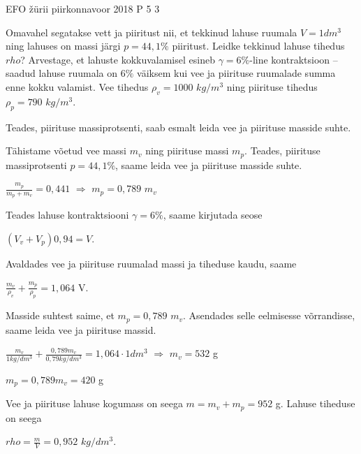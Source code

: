 {EFO žürii} %
{piirkonnavoor} %
{2018} %
{P 5} %
{3} %
{

\ifStatement
Omavahel segatakse vett ja piiritust nii, et tekkinud lahuse ruumala $V = 1 dm^3$ ning lahuses on massi järgi $p = 44,1\%$ piiritust. Leidke tekkinud lahuse tihedus $rho$? Arvestage, et lahuste kokkuvalamisel esineb $\gamma = 6 \%$-line kontraktsioon – saadud lahuse ruumala on $6 \%$ väiksem kui vee ja piirituse ruumalade summa enne kokku valamist. Vee tihedus $\rho_v = 1000$ $kg/m^3$ ning piirituse tihedus $\rho_p = 790$ $kg/m^3$.
\fi

\ifHint
Teades, piirituse massiprotsenti, saab esmalt leida vee ja piirituse masside suhte.
\fi

\ifSolution
Tähistame võetud vee massi $m_v$ ning piirituse massi $m_p$. Teades, piirituse massiprotsenti $p = 44,1 \%$, saame leida vee ja piirituse masside suhte.
\begin{center}
$\frac{m_p}{m_p + m_v} = 0,441$ $\Rightarrow$ $m_p = 0,789$ $m_v$ 
\end{center}
Teades lahuse kontraktsiooni $\gamma = 6 \%$, saame kirjutada seose
\begin{center}
$(V_v + V_p)0,94 = V$.
\end{center}
Avaldades vee ja piirituse ruumalad massi ja tiheduse kaudu, saame
\begin{center}
$\frac{m_v}{\rho_v} + \frac{m_p}{\rho_p} = 1,064$ V.
\end{center}
Masside suhtest saime, et $m_p = 0,789$ $m_v$. Asendades selle eelmisesse võrrandisse, saame leida vee ja piirituse massid.
\begin{center}
$\frac{m_v}{1 kg/dm^3} + \frac{0,789m_v}{0,79 kg/dm^3} = 1,064 \cdot 1 dm^3$ $\Rightarrow$ $m_v = 532$ g
\end{center}
\begin{center}
$m_p = 0,789m_v = 420$ g 
\end{center}
Vee ja piirituse lahuse kogumass on seega $m = m_v + m_p = 952$ g. Lahuse tiheduse on seega
\begin{center}
$rho = \frac{m}{V} = 0,952$ $kg/dm^3$.
\end{center}
\fi
}